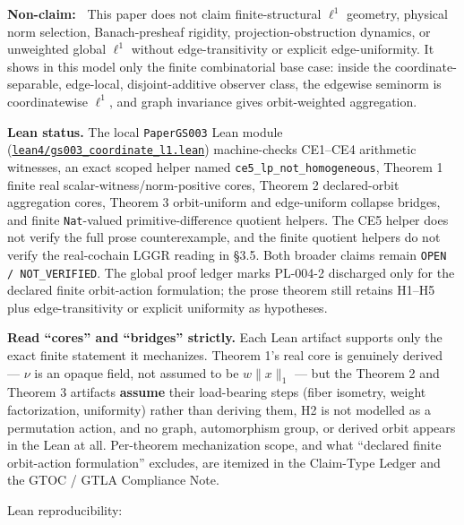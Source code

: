 \documentclass[
  11pt,
]{article}
\renewenvironment{quote}
  {\begin{leftbar}\small}
  {\end{leftbar}}
\newenvironment{nonclaim}{\begin{quote}\textbf{Non-claim:\ }}{\end{quote}}
\begin{document}
\begin{nonclaim}
This paper does not claim finite-structural $\ell^1$ geometry, physical norm selection, Banach-presheaf rigidity, projection-obstruction dynamics, or unweighted global $\ell^1$ without edge-transitivity or explicit edge-uniformity. It shows in this model only the finite combinatorial base case: inside the coordinate-separable, edge-local, disjoint-additive observer class, the edgewise seminorm is coordinatewise $\ell^1$, and graph invariance gives orbit-weighted aggregation.
\end{nonclaim}

\textbf{Lean status.} The local \texttt{PaperGS003} Lean module
(\href{lean4/gs003_coordinate_l1.lean}{\texttt{lean4/\allowbreak{}gs003\_\allowbreak{}coordinate\_\allowbreak{}l1.lean}})
machine-checks CE1--CE4 arithmetic witnesses, an exact scoped helper
named
\texttt{ce5\_\allowbreak{}lp\_\allowbreak{}not\_\allowbreak{}homogeneous},
Theorem 1 finite real scalar-witness/norm-positive cores, Theorem 2
declared-orbit aggregation cores, Theorem 3 orbit-uniform and
edge-uniform collapse bridges, and finite \texttt{Nat}-valued
primitive-difference quotient helpers. The CE5 helper does not verify
the full prose counterexample, and the finite quotient helpers do not
verify the real-cochain LGGR reading in §3.5. Both broader claims remain
\texttt{OPEN /\allowbreak{} NOT\_\allowbreak{}VERIFIED}. The global
proof ledger marks PL-004-2 discharged only for the declared finite
orbit-action formulation; the prose theorem still retains H1--H5 plus
edge-transitivity or explicit uniformity as hypotheses.

\textbf{Read ``cores'' and ``bridges'' strictly.} Each Lean artifact
supports only the exact finite statement it mechanizes. Theorem 1's real
core is genuinely derived --- \(\nu\) is an opaque field, not assumed to
be \(w\lVert x\rVert_1\) --- but the Theorem 2 and Theorem 3 artifacts
\textbf{assume} their load-bearing steps (fiber isometry, weight
factorization, uniformity) rather than deriving them, H2 is not modelled
as a permutation action, and no graph, automorphism group, or derived
orbit appears in the Lean at all. Per-theorem mechanization scope, and
what ``declared finite orbit-action formulation'' excludes, are itemized
in the Claim-Type Ledger and the GTOC / GTLA Compliance Note.

Lean reproducibility:
\end{document}
